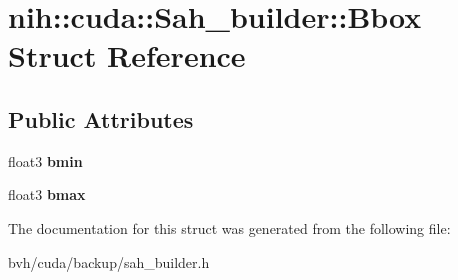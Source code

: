 \hypertarget{structnih_1_1cuda_1_1_sah__builder_1_1_bbox}{
\section{nih\-:\-:cuda\-:\-:\-Sah\-\_\-builder\-:\-:\-Bbox \-Struct \-Reference}
\label{structnih_1_1cuda_1_1_sah__builder_1_1_bbox}
}
\subsection*{\-Public \-Attributes}
\begin{DoxyCompactItemize}
\item 
\hypertarget{structnih_1_1cuda_1_1_sah__builder_1_1_bbox_a93f3cd24b09daa61e0bef38afe40ba2a}{
float3 {\bfseries bmin}}
\label{structnih_1_1cuda_1_1_sah__builder_1_1_bbox_a93f3cd24b09daa61e0bef38afe40ba2a}

\item 
\hypertarget{structnih_1_1cuda_1_1_sah__builder_1_1_bbox_a07811ae5c67d6910fb26524d37c5614b}{
float3 {\bfseries bmax}}
\label{structnih_1_1cuda_1_1_sah__builder_1_1_bbox_a07811ae5c67d6910fb26524d37c5614b}

\end{DoxyCompactItemize}


\-The documentation for this struct was generated from the following file\-:\begin{DoxyCompactItemize}
\item 
bvh/cuda/backup/sah\-\_\-builder.\-h\end{DoxyCompactItemize}

